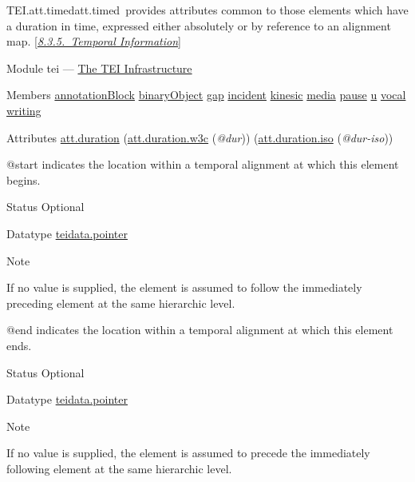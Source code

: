 \begin{reflist}
\item[]\begin{specHead}{TEI.att.timed}{att.timed} provides attributes common to those elements which have a duration in time, expressed either absolutely or by reference to an alignment map. [\textit{\hyperref[TSBATI]{8.3.5.\ Temporal Information}}]\end{specHead} 
    \item[{Module}]
  tei — \hyperref[ST]{The TEI Infrastructure}
    \item[{Members}]
  \hyperref[TEI.annotationBlock]{annotationBlock} \hyperref[TEI.binaryObject]{binaryObject} \hyperref[TEI.gap]{gap} \hyperref[TEI.incident]{incident} \hyperref[TEI.kinesic]{kinesic} \hyperref[TEI.media]{media} \hyperref[TEI.pause]{pause} \hyperref[TEI.u]{u} \hyperref[TEI.vocal]{vocal} \hyperref[TEI.writing]{writing}
    \item[{Attributes}]
  \hyperref[TEI.att.duration]{att.duration} (\hyperref[TEI.att.duration.w3c]{att.duration.w3c} (\textit{@dur})) (\hyperref[TEI.att.duration.iso]{att.duration.iso} (\textit{@dur-iso})) \hfil\\[-10pt]\begin{sansreflist}
    \item[@start]
  indicates the location within a temporal alignment at which this element begins.
\begin{reflist}
    \item[{Status}]
  Optional
    \item[{Datatype}]
  \hyperref[TEI.teidata.pointer]{teidata.pointer}
    \item[{Note}]
  \par
If no value is supplied, the element is assumed to follow the immediately preceding element at the same hierarchic level.
\end{reflist}  
    \item[@end]
  indicates the location within a temporal alignment at which this element ends.
\begin{reflist}
    \item[{Status}]
  Optional
    \item[{Datatype}]
  \hyperref[TEI.teidata.pointer]{teidata.pointer}
    \item[{Note}]
  \par
If no value is supplied, the element is assumed to precede the immediately following element at the same hierarchic level.
\end{reflist}  
\end{sansreflist}  
\end{reflist}  
